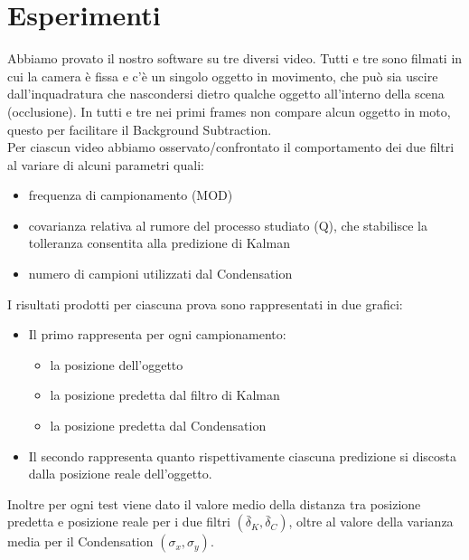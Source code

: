 ﻿     %

\section{Esperimenti}

Abbiamo provato il nostro software su tre diversi video. Tutti e tre sono filmati in cui la camera è fissa e c'è un singolo oggetto in movimento, che può sia uscire dall'inquadratura che nascondersi dietro qualche oggetto all'interno della scena (occlusione). In tutti e tre nei primi frames  non compare alcun oggetto in moto, questo per facilitare il Background Subtraction.\\

Per ciascun video abbiamo osservato/confrontato il comportamento dei due filtri al variare di alcuni parametri quali:
\begin{itemize}
\item frequenza di campionamento (MOD)
\item covarianza relativa al rumore del processo studiato (Q), che stabilisce la tolleranza consentita alla predizione di Kalman
\item numero di campioni utilizzati dal Condensation\\
\end{itemize}

I risultati prodotti per ciascuna prova sono rappresentati in due grafici:
\begin{itemize}
\item Il primo rappresenta per ogni campionamento:
\begin{itemize}
\item la posizione dell'oggetto
\item la posizione predetta dal filtro di Kalman
\item la posizione predetta dal Condensation
\end{itemize}
\item Il secondo rappresenta quanto rispettivamente ciascuna predizione si discosta dalla posizione reale dell'oggetto.
\end{itemize}

Inoltre per ogni test viene dato il valore medio della distanza tra posizione predetta e posizione reale per i due filtri \begin{math}(\bar \delta_K, \bar \delta_C)\end{math}, oltre al valore della varianza media per il Condensation \begin{math}(\sigma_x,\sigma_y)\end{math}.

